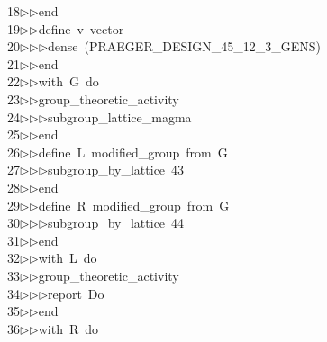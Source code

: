 \begin{tabbing}
18\>$\triangleright$\>$\triangleright$\>end\ \\[0pt]
19\>$\triangleright$\>$\triangleright$\>define\ v\ vector\ \\[0pt]
20\>$\triangleright$\>$\triangleright$\>$\triangleright$\>dense\ (PRAEGER\_DESIGN\_45\_12\_3\_GENS)\ \\[0pt]
21\>$\triangleright$\>$\triangleright$\>end\ \\[0pt]
22\>$\triangleright$\>$\triangleright$\>with\ G\ do\ \\[0pt]
23\>$\triangleright$\>$\triangleright$\>group\_theoretic\_activity\ \\[0pt]
24\>$\triangleright$\>$\triangleright$\>$\triangleright$\>subgroup\_lattice\_magma\ \\[0pt]
25\>$\triangleright$\>$\triangleright$\>end\ \\[0pt]
26\>$\triangleright$\>$\triangleright$\>define\ L\ modified\_group\ from\ G\ \\[0pt]
27\>$\triangleright$\>$\triangleright$\>$\triangleright$\>subgroup\_by\_lattice\ 43\ \\[0pt]
28\>$\triangleright$\>$\triangleright$\>end\ \\[0pt]
29\>$\triangleright$\>$\triangleright$\>define\ R\ modified\_group\ from\ G\ \\[0pt]
30\>$\triangleright$\>$\triangleright$\>$\triangleright$\>subgroup\_by\_lattice\ 44\ \\[0pt]
31\>$\triangleright$\>$\triangleright$\>end\ \\[0pt]
32\>$\triangleright$\>$\triangleright$\>with\ L\ do\ \\[0pt]
33\>$\triangleright$\>$\triangleright$\>group\_theoretic\_activity\ \\[0pt]
34\>$\triangleright$\>$\triangleright$\>$\triangleright$\>report\ Do\ \\[0pt]
35\>$\triangleright$\>$\triangleright$\>end\ \\[0pt]
36\>$\triangleright$\>$\triangleright$\>with\ R\ do\ \\[0pt]

\end{tabbing}

